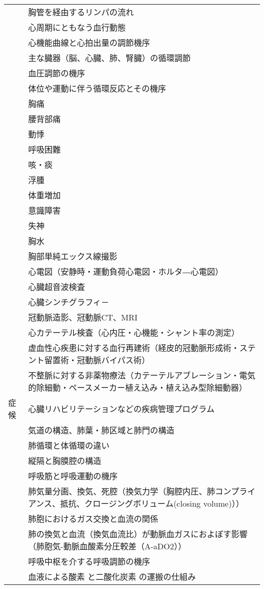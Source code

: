 \begin{xltabular}{\linewidth}{XX}
 & 胸管を経由するリンパの流れ \\
 & 心周期にともなう血行動態 \\
 & 心機能曲線と心拍出量の調節機序 \\
 & 主な臓器（脳、心臓、肺、腎臓）の循環調節 \\
 & 血圧調節の機序 \\
 & 体位や運動に伴う循環反応とその機序 \\
 & 胸痛 \\
 & 腰背部痛 \\
 & 動悸 \\
 & 呼吸困難 \\
 & 咳・痰 \\
 & 浮腫 \\
 & 体重増加 \\
 & 意識障害 \\
 & 失神 \\
 & 胸水 \\
 & 胸部単純エックス線撮影 \\
 & 心電図（安静時・運動負荷心電図・ホルタ―心電図） \\
 & 心臓超音波検査 \\
 & 心臓シンチグラフィ－ \\
 & 冠動脈造影、冠動脈CT、MRI \\
 & 心カテーテル検査（心内圧・心機能・シャント率の測定） \\
 & 虚血性心疾患に対する血行再建術（経皮的冠動脈形成術・ステント留置術・冠動脈バイパス術） \\
 & 不整脈に対する非薬物療法（カテーテルアブレーション・電気的除細動・ペースメーカー植え込み・植え込み型除細動器） \\
症候 & 心臓リハビリテーションなどの疾病管理プログラム \\
 & 気道の構造、肺葉・肺区域と肺門の構造 \\
 & 肺循環と体循環の違い \\
 & 縦隔と胸膜腔の構造 \\
 & 呼吸筋と呼吸運動の機序 \\
 & 肺気量分画、換気、死腔（換気力学（胸腔内圧、肺コンプライアンス、抵抗、クロージングボリューム(closing volume)）） \\
 & 肺胞におけるガス交換と血流の関係 \\
 & 肺の換気と血流（換気血流比）が動脈血ガスにおよぼす影響（肺胞気-動脈血酸素分圧較差（A-aDO2）） \\
 & 呼吸中枢を介する呼吸調節の機序 \\
 & 血液による酸素 と二酸化炭素 の運搬の仕組み \\

\end{xltabular}
